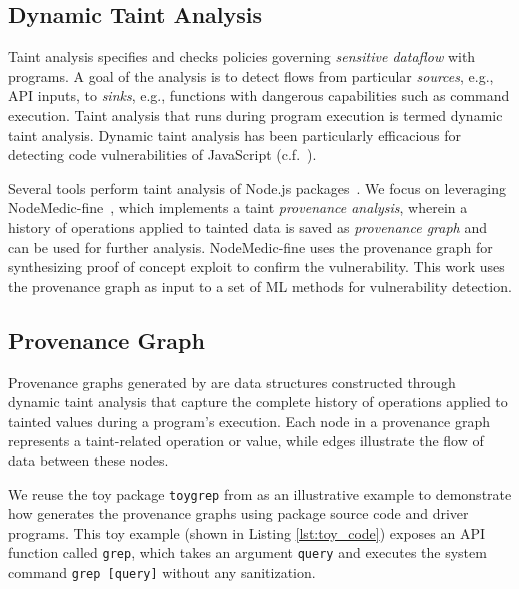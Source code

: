 \documentclass[12pt,openany,oneside,table]{cmuthesis}
\begin{document}
\subsection{Dynamic Taint Analysis}

Taint analysis specifies and checks policies governing \emph{sensitive dataflow} with programs. A goal of the analysis is to detect flows from particular \emph{sources}, e.g., API inputs, to \emph{sinks}, e.g., functions with dangerous capabilities such as command execution. Taint analysis that runs during program execution is termed dynamic taint analysis. Dynamic taint analysis has been particularly efficacious for detecting code vulnerabilities of JavaScript (c.f.~\cite{andreasen-Survey}).

Several tools perform taint analysis of Node.js packages~\cite{karim-PlatformIndependent,nielsen-Nodest,gauthier-AFFOGATO,song_ObjLupAnsys,ming_taintpipe,jsprime_2013,staicu-Extracting}. We focus on leveraging NodeMedic-fine~\cite{nodemedic-fine}, which implements a taint \emph{provenance analysis}, wherein a history of operations applied to tainted data is saved as \emph{provenance graph} and can be used for further analysis. NodeMedic-fine uses the provenance graph for synthesizing proof of concept exploit to confirm the vulnerability. This work uses the provenance graph as input to a set of ML methods for vulnerability detection.

\subsection{Provenance Graph}
\label{subsec:provenance-analysis}

Provenance graphs generated by \nodemedicfine are data structures constructed through dynamic taint analysis that capture the complete history of operations applied to tainted values during a program's execution. 
Each node in a provenance graph represents a taint-related operation or value, while edges illustrate the flow of data between these nodes.

We reuse the toy package \texttt{toygrep} from \nodemedic{} \cite{cassel2023nodemedic} as an illustrative example to demonstrate how \nodemedic generates the provenance graphs using package source code and driver programs. This toy example (shown in Listing \ref{lst:toy_code}) exposes an API function called \texttt{grep}, which takes an argument \texttt{query} and executes the system command \texttt{grep [query]} without any sanitization.
\end{document}
